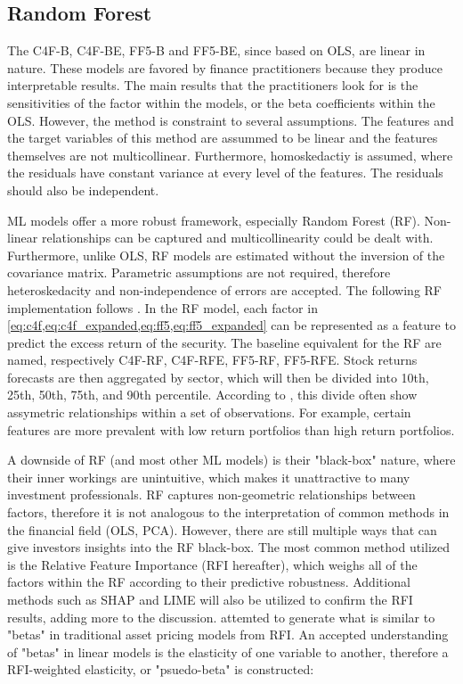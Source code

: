 \subsection{Random Forest}



The C4F-B, C4F-BE, FF5-B and FF5-BE, since based on OLS, are linear in nature. These models are favored by finance practitioners because they produce interpretable results. The main results that the practitioners look for is the sensitivities of the factor within the models, or the beta coefficients within the OLS. However, the method is constraint to several assumptions. The features and the target variables of this method are assummed to be linear and the features themselves are not multicollinear. Furthermore, homoskedactiy is assumed, where the residuals have constant variance at every level of the features. The residuals should also be independent.

ML models offer a more robust framework, especially Random Forest (RF). Non-linear relationships can be captured and multicollinearity could be dealt with. Furthermore, unlike OLS, RF models are estimated without the inversion of the covariance matrix. Parametric assumptions are not required, therefore heteroskedacity and non-independence of errors are accepted. The following RF implementation follows . In the RF model, each factor in \cref{eq:c4f,eq:c4f_expanded,eq:ff5,eq:ff5_expanded} can be represented as a feature to predict the excess return of the security. The baseline equivalent for the RF are named, respectively C4F-RF, C4F-RFE, FF5-RF, FF5-RFE. Stock returns forecasts are then aggregated by sector, which will then be divided into 10th, 25th, 50th, 75th, and 90th percentile. According to , this divide often show assymetric relationships within a set of observations. For example, certain features are more prevalent with low return portfolios than high return portfolios.

A downside of RF (and most other ML models) is their "black-box" nature, where their inner workings are unintuitive, which makes it unattractive to many investment professionals. RF captures non-geometric relationships between factors, therefore it is not analogous to the interpretation of common methods in the financial field (OLS, PCA). However, there are still multiple ways that can give investors insights into the RF black-box. The most common method utilized is the Relative Feature Importance (RFI hereafter), which weighs all of the factors within the RF according to their predictive robustness. Additional methods such as SHAP and LIME will also be utilized to confirm the RFI results, adding more to the discussion. attemted to generate what is similar to "betas" in traditional asset pricing models from RFI. An accepted understanding of "betas" in linear models is the elasticity of one variable to another, therefore a RFI-weighted elasticity, or "psuedo-beta" is constructed:

